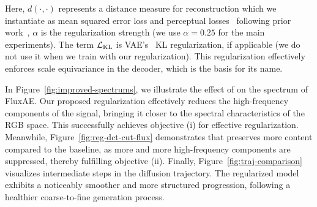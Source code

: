 Here, $d(\cdot,\cdot)$ represents a distance measure for reconstruction which we instantiate as mean squared error loss and perceptual losses~\cite{lpips} following prior work~\cite{LDM}, $\alpha$ is the regularization strength (we use $\alpha = 0.25$ for the main experiments).
The term $\mathcal{L}_\text{KL}$ is VAE's~\cite{VAE} KL regularization, if applicable (we do not use it when we train with our regularization).
This regularization effectively enforces scale equivariance in the decoder, which is the basis for its name.  

In Figure~\ref{fig:improved-spectrums}, we illustrate the effect of \regname on the spectrum of FluxAE. Our proposed regularization effectively reduces the high-frequency components of the signal, bringing it closer to the spectral characteristics of the RGB space. This successfully achieves objective (i) for effective regularization.
Meanwhile, Figure~\ref{fig:reg-dct-cut-flux} demonstrates that \regname preserves more content compared to the baseline, as more and more high-frequency components are suppressed, thereby fulfilling objective (ii).
Finally, Figure~\ref{fig:traj-comparison} visualizes intermediate steps in the diffusion trajectory. The regularized model exhibits a noticeably smoother and more structured progression, following a healthier coarse-to-fine generation process.
\vspace{-0.1cm}




